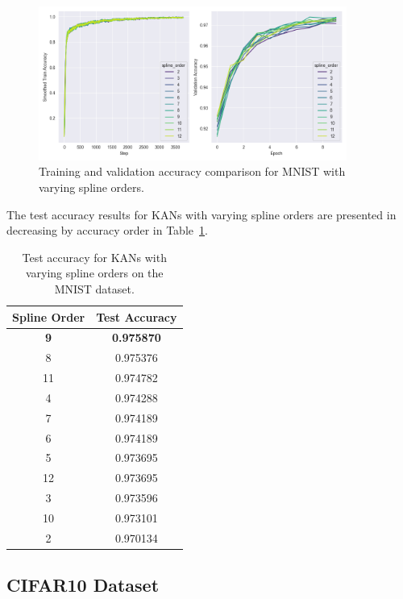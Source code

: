 \documentclass{article}
\begin{document}
\begin{figure}[H]
    \centering
    \includegraphics[width=0.9\textwidth]{pics/mnist_accuracy_spline_order}
    \caption{Training and validation accuracy comparison for MNIST with varying spline orders.}
    \label{fig:mnist_accuracy_spline_order}
\end{figure}


The test accuracy results for KANs with varying spline orders are presented in decreasing by accuracy order in Table~\ref{tab:test_accuracy_spline_order}.

\begin{table}[H]
    \centering
    \caption{Test accuracy for KANs with varying spline orders on the MNIST dataset.}
    \label{tab:test_accuracy_spline_order}
    \begin{tabular}{|c|c|}
        \hline
        Spline Order & Test Accuracy \\
        \hline
        \textbf{9}           & \textbf{0.975870} \\
        8           & 0.975376 \\
        11          & 0.974782 \\
        4           & 0.974288 \\
        7           & 0.974189 \\
        6           & 0.974189 \\
        5           & 0.973695 \\
        12          & 0.973695 \\
        3           & 0.973596 \\
        10          & 0.973101 \\
        2           & 0.970134 \\
        \hline
    \end{tabular}
\end{table}



\subsection{CIFAR10 Dataset}\label{subsec:cifar10}
\end{document}
